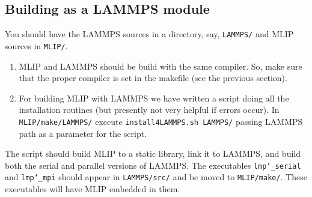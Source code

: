 \documentclass[12pt]{article}
\renewcommand{\_}{\char`_}
\begin{document}
\subsection{Building as a LAMMPS module}\label{sec:install:lammps}

You should have the LAMMPS sources in a directory, say, \texttt{LAMMPS/} and MLIP sources in \texttt{MLIP/}. 

\begin{enumerate}
	\item MLIP and LAMMPS should be build with the same compiler. So, make sure that the proper compiler is set in the makefile (see the previous section). 

	\item For building MLIP with LAMMPS we have written a script doing all the installation routines (but presently not very helpful if errors occur). 
	\subitem In \texttt{MLIP/make/LAMMPS/} execute \texttt{install4LAMMPS.sh LAMMPS/} passing LAMMPS path as a parameter for the script. 
\end{enumerate}

The script should build MLIP to a static library, link it to LAMMPS, and build both the serial and parallel versions of LAMMPS.	The executables \texttt{lmp\_serial} and \texttt{lmp\_mpi} should appear in \texttt{LAMMPS/src/} and be moved to \texttt{MLIP/make/}. These executables will have MLIP embedded in them.	

\end{document}
